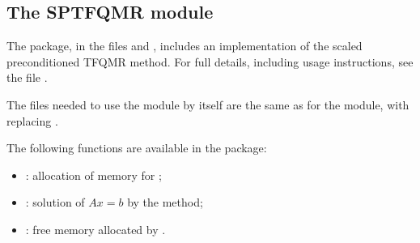 \subsection{The SPTFQMR module}\label{ss:sptfqmr}

The {\sptfqmr} package, in the files  and , includes an
implementation of the scaled preconditioned TFQMR method.  
For full details, including usage instructions, see the file .

The files needed to use the {\sptfqmr} module by itself are the same as for the
{\spgmr} module, with  replacing .

The following functions are available in the {\sptfqmr} package:  
\begin{itemize}
\item {}: allocation of memory for ;
\item {}: solution of $Ax = b$ by the {\sptfqmr} method;
\item {}: free memory allocated by .
\end{itemize}
